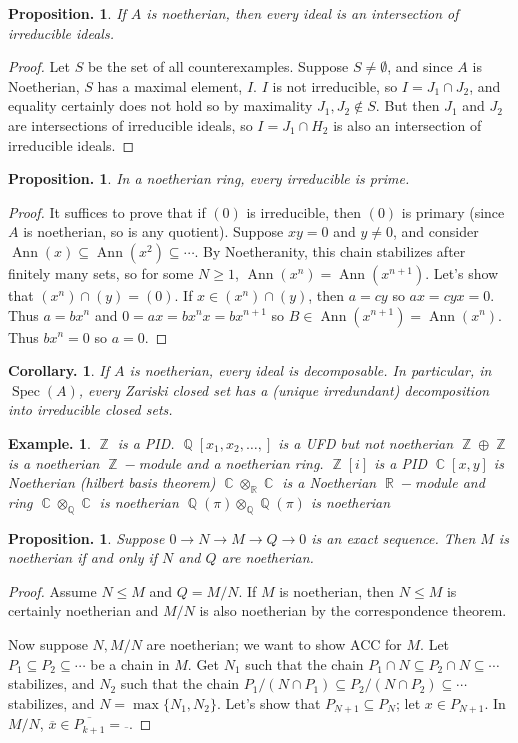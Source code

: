 \documentclass[11pt, a4paper]{memoir}
\DeclareMathOperator{\Q}{{\mathbb{Q}}}
\DeclareMathOperator{\Z}{{\mathbb{Z}}}
\DeclareMathOperator{\R}{{\mathbb{R}}}
\DeclareMathOperator{\C}{{\mathbb{C}}}
\theoremstyle{change}
\newtheorem{corollary}[theorem]{Corollary.}
\newtheorem{proposition}[theorem]{Proposition.}
\theoremstyle{plain}
\theoremstyle{nonumberplain}
\newtheorem{example}{Example.}
\newtheorem{proof}{Proof}
\DeclareMathOperator{\Ann}{Ann}
\DeclareMathOperator{\Spec}{Spec}
\numberwithin{equation}{section}
\begin{document}
\begin{proposition}
    If $A$ is noetherian, then every ideal is an intersection of irreducible ideals.
\end{proposition}
\begin{proof}
    Let $S$ be the set of all counterexamples.
    Suppose $S\neq\emptyset$, and since $A$ is Noetherian, $S$ has a maximal element, $I$.
    $I$ is not irreducible, so $I=J_1\cap J_2$, and equality certainly does not hold so by maximality $J_1,J_2\notin S$.
    But then $J_1$ and $J_2$ are intersections of irreducible ideals, so $I=J_1\cap H_2$ is also an intersection of irreducible ideals.
\end{proof}
\begin{proposition}
    In a noetherian ring, every irreducible is prime.
\end{proposition}
\begin{proof}
    It suffices to prove that if $(0)$ is irreducible, then $(0)$ is primary (since $A$ is noetherian, so is any quotient).
    Suppose $xy=0$ and $y\neq 0$, and consider $\Ann(x)\subseteq\Ann(x^2)\subseteq\cdots$.
    By Noetheranity, this chain stabilizes after finitely many sets, so for some $N\geq 1$, $\Ann(x^n)=\Ann(x^{n+1})$.
    Let's show that $(x^n)\cap(y)=(0)$.
    If $x\in (x^n)\cap(y)$, then $a=cy$ so $ax=cyx=0$.
    Thus $a=bx^n$ and $0=ax=bx^nx=bx^{n+1}$ so $B\in\Ann(x^{n+1})=\Ann(x^n)$.
    Thus $bx^n=0$ so $a=0$.
\end{proof}
\begin{corollary}
    If $A$ is noetherian, every ideal is decomposable.
    In particular, in $\Spec(A)$, every Zariski closed set has a (unique irredundant) decomposition into irreducible closed sets.
\end{corollary}
\begin{example}
    $\Z$ is a PID.
    $\Q[x_1,x_2,\ldots,]$ is a UFD but not noetherian
    $\Z\oplus\Z$ is a noetherian $\Z-$module and a noetherian ring.
    $\Z[i]$ is a PID
    $\C[x,y]$ is Noetherian (hilbert basis theorem)
    $\C\otimes_{\R}\C$ is a Noetherian $\R-$module and ring
    $\C\otimes_{\Q}\C$ is noetherian
    $\Q(\pi)\otimes_{\Q}\Q(\pi)$ is noetherian
\end{example}
\begin{proposition}
    Suppose $0\to N\to M\to Q\to 0$ is an exact sequence.
    Then $M$ is noetherian if and only if $N$ and $Q$ are noetherian.
\end{proposition}
\begin{proof}
    Assume $N\leq M$ and $Q=M/N$.
    If $M$ is noetherian, then $N\leq M$ is certainly noetherian and $M/N$ is also noetherian by the correspondence theorem.

    Now suppose $N,M/N$ are noetherian; we want to show ACC for $M$.
    Let $P_1\subseteq P_2\subseteq\cdots$ be a chain in $M$.
    Get $N_1$ such that the chain $P_1\cap N\subseteq P_2\cap N\subseteq\cdots$ stabilizes, and $N_2$ such that the chain $P_1/(N\cap P_1)\subseteq P_2/(N\cap P_2)\subseteq\cdots$ stabilizes, and $N=\max\{N_1,N_2\}$.
    Let's show that $P_{N+1}\subseteq P_N$; let $x\in P_{N+1}$.
    In $M/N$, $\overline{x}\in\overline{P_{k+1}}=\overline{}$.
\end{proof}
\end{document}
